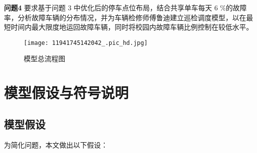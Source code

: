 \documentclass[withoutpreface,bwprint]{cumcmthesis}
\begin{document}
\textbf{问题4}  要求基于问题 3 中优化后的停车点位布局，结合共享单车每天 6 \%的故障率，分析故障车辆的分布情况，并为车辆检修师傅鲁迪建立巡检调度模型，以在最短时间内最大限度地运回故障车辆，同时将校园内故障车辆比例控制在较低水平。

\begin{figure}[htbp]
  \centering
  \texttt{[image: 11941745142042\_.pic\_hd.jpg]} %
  \caption{模型总流程图} 
  \label{fig:模型总流程图}
\end{figure}






\section{模型假设与符号说明}
\subsection{模型假设}
为简化问题，本文做出以下假设：
\end{document}

